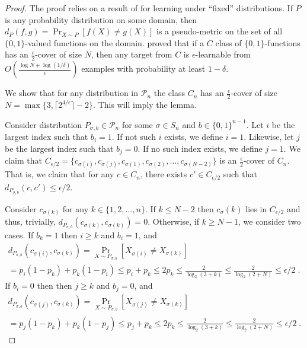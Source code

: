\documentclass[10pt]{article}
\renewcommand{\P}{\mathcal{P}}
\begin{document}
\begin{proof}
The proof relies on a result of \cite{Benedek-Itai-1991} for learning under
``fixed'' distributions. If $P$ is any probability distribution on some domain,
then $d_P(f,g) = \Pr_{X \sim P}[f(X) \neq g(X)]$ is a pseudo-metric on the set of all
$\{0,1\}$-valued functions on the domain. \cite{Benedek-Itai-1991} proved that
if a $C$ class of $\{0,1\}$-functions has an $\frac{\epsilon}{2}$-cover of size
$N$, then any target from $C$ is $\epsilon$-learnable from $O
\left( \frac{\log N + \log (1/\delta)}{\epsilon}\right)$ examples
with probability at least $1-\delta$.

We show that for any distribution in $\P_n$ the class $C_n$ has an $\frac{\epsilon}{2}$-cover of size
$N = \max\{3, \lceil 2^{4/\epsilon}\rceil  - 2 \}$. This will imply the lemma.

Consider distribution $P_{\sigma,b} \in \P_n$ for some $\sigma \in S_n$ and $b
\in \{0,1\}^{n-1}$. Let $i$ be the largest index such that $b_i = 1$.
If not such $i$ exists, we define $i=1$. Likewise, let $j$ be the largest
index such that $b_j = 0$. If no such index exists, we define $j=1$.
We claim that $C_{\epsilon/2} = \{ c_{\sigma(i)}, c_{\sigma(j)}, c_{\sigma(1)},
c_{\sigma(2)}, \dots, c_{\sigma(N-2)}\}$ is an $\frac{\epsilon}{2}$-cover of
$C_n$. That is, we claim that for any $c \in C_n$, there exists $c' \in
C_{\epsilon/2}$ such that $d_{P_{\sigma,b}}(c,c') \le \epsilon/2$.

Consider $c_{\sigma(k)}$ for any $k \in \{1,2,\dots,n\}$. If $k \le N - 2$
then $c_\sigma(k)$ lies in $C_{\epsilon/2}$ and thus, trivially, $d_{P_{\sigma,b}}(c_{\sigma(k)},c_{\sigma(k)}) = 0$.
Otherwise, if  $k \ge N - 1$, we consider two cases. If $b_k = 1$ then $i \ge k$ and $b_i = 1$, and
\begin{multline*}
d_{P_{\sigma,b}}(c_{\sigma(i)}, c_{\sigma(k)})
= \Pr_{X \sim P_{\sigma,b}}[X_{\sigma(i)} \neq X_{\sigma(k)} ] \\
= p_i (1 - p_k) + p_k (1 - p_i)
\le p_i + p_k
\le 2 p_k
\le \frac{2}{\log_2(3 + k)}
\le \frac{2}{\log_2(2 + N)}
\le \epsilon/2 \; .
\end{multline*}
If $b_i = 0$ then then $j \ge k$ and $b_j = 0$, and
\begin{multline*}
d_{P_{\sigma,b}}(c_{\sigma(j)}, c_{\sigma(k)})
= \Pr_{X \sim P_{\sigma,b}}[X_{\sigma(j)} \neq X_{\sigma(k)} ] \\
= p_j (1 - p_k) + p_k (1 - p_j)
\le p_j + p_k
\le 2 p_k
\le \frac{2}{\log_2(3 + k)}
\le \frac{2}{\log_2(2 + N)}
\le \epsilon/2 \; .
\end{multline*}
\end{proof}
\end{document}
